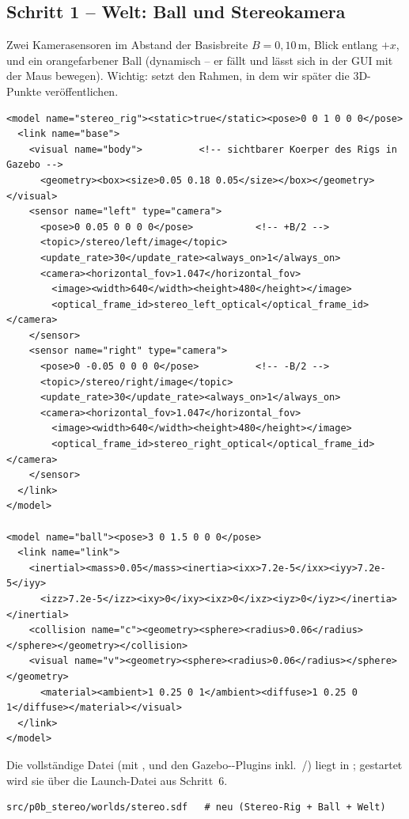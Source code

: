 \subsection{Schritt 1 -- Welt: Ball und Stereokamera}
Zwei Kamerasensoren im Abstand der Basisbreite $B=0{,}10\,$m, Blick entlang
$+x$, und ein orangefarbener Ball (dynamisch -- er fällt und lässt sich in der
GUI mit der Maus bewegen). Wichtig:  setzt den Rahmen,
in dem wir später die 3D-Punkte veröffentlichen.
\begin{lstlisting}[style=xml,caption={\code{worlds/stereo.sdf} (Auszug -- Ground/Sun/Plugins analog)}]
<model name="stereo_rig"><static>true</static><pose>0 0 1 0 0 0</pose>
  <link name="base">
    <visual name="body">          <!-- sichtbarer Koerper des Rigs in Gazebo -->
      <geometry><box><size>0.05 0.18 0.05</size></box></geometry></visual>
    <sensor name="left" type="camera">
      <pose>0 0.05 0 0 0 0</pose>           <!-- +B/2 -->
      <topic>/stereo/left/image</topic>
      <update_rate>30</update_rate><always_on>1</always_on>
      <camera><horizontal_fov>1.047</horizontal_fov>
        <image><width>640</width><height>480</height></image>
        <optical_frame_id>stereo_left_optical</optical_frame_id></camera>
    </sensor>
    <sensor name="right" type="camera">
      <pose>0 -0.05 0 0 0 0</pose>          <!-- -B/2 -->
      <topic>/stereo/right/image</topic>
      <update_rate>30</update_rate><always_on>1</always_on>
      <camera><horizontal_fov>1.047</horizontal_fov>
        <image><width>640</width><height>480</height></image>
        <optical_frame_id>stereo_right_optical</optical_frame_id></camera>
    </sensor>
  </link>
</model>

<model name="ball"><pose>3 0 1.5 0 0 0</pose>
  <link name="link">
    <inertial><mass>0.05</mass><inertia><ixx>7.2e-5</ixx><iyy>7.2e-5</iyy>
      <izz>7.2e-5</izz><ixy>0</ixy><ixz>0</ixz><iyz>0</iyz></inertia></inertial>
    <collision name="c"><geometry><sphere><radius>0.06</radius></sphere></geometry></collision>
    <visual name="v"><geometry><sphere><radius>0.06</radius></sphere></geometry>
      <material><ambient>1 0.25 0 1</ambient><diffuse>1 0.25 0 1</diffuse></material></visual>
  </link>
</model>
\end{lstlisting}
\noindent Die vollständige Datei (mit ,  und den
Gazebo--Plugins inkl.\ /) liegt in
; gestartet wird sie über die Launch-Datei aus
Schritt~6.
\begin{lstlisting}[style=bash,caption={\code{ros2\_ws}-Delta nach Schritt 1 (\# neu)}]
src/p0b_stereo/worlds/stereo.sdf   # neu (Stereo-Rig + Ball + Welt)
\end{lstlisting}

